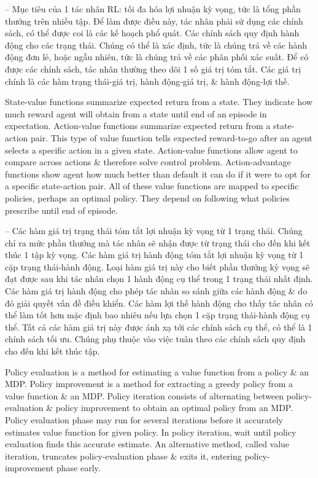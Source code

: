 \documentclass{article}
\begin{document}
\begin{itemize}
\begin{itemize}
        -- Mục tiêu của 1 tác nhân RL: tối đa hóa lợi nhuận kỳ vọng, tức là tổng phần thưởng trên nhiều tập. Để làm được điều này, tác nhân phải sử dụng các chính sách, có thể được coi là các kế hoạch phổ quát. Các chính sách quy định hành động cho các trạng thái. Chúng có thể là xác định, tức là chúng trả về các hành động đơn lẻ, hoặc ngẫu nhiên, tức là chúng trả về các phân phối xác suất. Để có được các chính sách, tác nhân thường theo dõi 1 số giá trị tóm tắt. Các giá trị chính là các hàm trạng thái-giá trị, hành động-giá trị, \& hành động-lợi thế.

        State-value functions summarize expected return from a state. They indicate how much reward agent will obtain from a state until end of an episode in expectation. Action-value functions summarize expected return from a state-action pair. This type of value function tells expected reward-to-go after an agent selects a specific action in a given state. Action-value functions allow agent to compare across actions \& therefore solve control problem. Action-advantage functions show agent how much better than default it can do if it were to opt for a specific state-action pair. All of these value functions are mapped to specific policies, perhaps an optimal policy. They depend on following what policies prescribe until end of episode.

        -- Các hàm giá trị trạng thái tóm tắt lợi nhuận kỳ vọng từ 1 trạng thái. Chúng chỉ ra mức phần thưởng mà tác nhân sẽ nhận được từ trạng thái cho đến khi kết thúc 1 tập kỳ vọng. Các hàm giá trị hành động tóm tắt lợi nhuận kỳ vọng từ 1 cặp trạng thái-hành động. Loại hàm giá trị này cho biết phần thưởng kỳ vọng sẽ đạt được sau khi tác nhân chọn 1 hành động cụ thể trong 1 trạng thái nhất định. Các hàm giá trị hành động cho phép tác nhân so sánh giữa các hành động \& do đó giải quyết vấn đề điều khiển. Các hàm lợi thế hành động cho thấy tác nhân có thể làm tốt hơn mặc định bao nhiêu nếu lựa chọn 1 cặp trạng thái-hành động cụ thể. Tất cả các hàm giá trị này được ánh xạ tới các chính sách cụ thể, có thể là 1 chính sách tối ưu. Chúng phụ thuộc vào việc tuân theo các chính sách quy định cho đến khi kết thúc tập.

        Policy evaluation is a method for estimating a value function from a policy \& an MDP. Policy improvement is a method for extracting a greedy policy from a value function \& an MDP. Policy iteration consists of alternating between policy-evaluation \& policy improvement to obtain an optimal policy from an MDP. Policy evaluation phase may run for several iterations before it accurately estimates value function for given policy. In policy iteration, wait until policy evaluation finds this accurate estimate. An alternative method, called value iteration, truncates policy-evaluation phase \& exits it, entering policy-improvement phase early.


\end{itemize}
\end{itemize}
\end{document}
